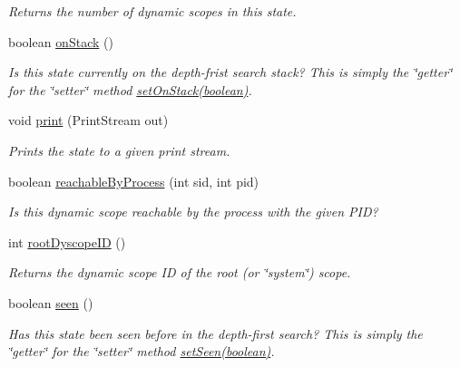 \begin{DoxyCompactItemize}
\begin{DoxyCompactList}\small\item\em Returns the number of dynamic scopes in this state. \end{DoxyCompactList}\item 
boolean \hyperlink{classedu_1_1udel_1_1cis_1_1vsl_1_1civl_1_1state_1_1common_1_1immutable_1_1ImmutableState_a6d2b82051a0ebfc60519c3fff40e9b07}{on\+Stack} ()
\begin{DoxyCompactList}\small\item\em Is this state currently on the depth-\/frist search stack? This is simply the \char`\"{}getter\char`\"{} for the \char`\"{}setter\char`\"{} method \hyperlink{classedu_1_1udel_1_1cis_1_1vsl_1_1civl_1_1state_1_1common_1_1immutable_1_1ImmutableState_ab9e4c0ce0614da2f23d60ad4cf98f3ed}{set\+On\+Stack(boolean)}. \end{DoxyCompactList}\item 
void \hyperlink{classedu_1_1udel_1_1cis_1_1vsl_1_1civl_1_1state_1_1common_1_1immutable_1_1ImmutableState_ab6effb25ec1f30d5ad889e75a7b11fc4}{print} (Print\+Stream out)
\begin{DoxyCompactList}\small\item\em Prints the state to a given print stream. \end{DoxyCompactList}\item 
boolean \hyperlink{classedu_1_1udel_1_1cis_1_1vsl_1_1civl_1_1state_1_1common_1_1immutable_1_1ImmutableState_a963e1ff456661dd2c67f4a2e73553308}{reachable\+By\+Process} (int sid, int pid)
\begin{DoxyCompactList}\small\item\em Is this dynamic scope reachable by the process with the given P\+I\+D? \end{DoxyCompactList}\item 
int \hyperlink{classedu_1_1udel_1_1cis_1_1vsl_1_1civl_1_1state_1_1common_1_1immutable_1_1ImmutableState_a2f0283dfe2c60eb5072fae80de3526ca}{root\+Dyscope\+I\+D} ()
\begin{DoxyCompactList}\small\item\em Returns the dynamic scope I\+D of the root (or \char`\"{}system\char`\"{}) scope. \end{DoxyCompactList}\item 
boolean \hyperlink{classedu_1_1udel_1_1cis_1_1vsl_1_1civl_1_1state_1_1common_1_1immutable_1_1ImmutableState_a31eaa3bd0e37cf54ea97c4f608e83a85}{seen} ()
\begin{DoxyCompactList}\small\item\em Has this state been seen before in the depth-\/first search? This is simply the \char`\"{}getter\char`\"{} for the \char`\"{}setter\char`\"{} method \hyperlink{classedu_1_1udel_1_1cis_1_1vsl_1_1civl_1_1state_1_1common_1_1immutable_1_1ImmutableState_a5638bba28e0c3107023f76c45ef58581}{set\+Seen(boolean)}. \end{DoxyCompactList}\item 

\end{DoxyCompactItemize}
